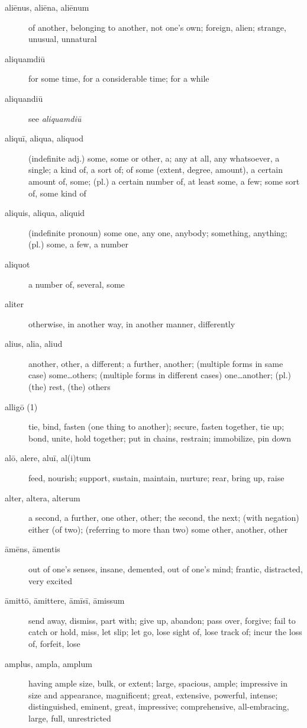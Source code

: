 \begin{description}
    \item[aliēnus, aliēna, aliēnum] of another, belonging to another, not one's own; foreign, alien; strange, unusual, unnatural
    \item[aliquamdiū] for some time, for a considerable time; for a while
    \item[aliquandiū] see \textit{aliquamdiū}
    \item[aliquī, aliqua, aliquod] (indefinite adj.) some, some or other, a; any at all, any whatsoever, a single; a kind of, a sort of; of some (extent, degree, amount), a certain amount of, some; (pl.) a certain number of, at least some, a few; some sort of, some kind of
    \item[aliquis, aliqua, aliquid] (indefinite pronoun) some one, any one, anybody; something, anything; (pl.) some, a few, a number
    \item[aliquot] a number of, several, some
    \item[aliter] otherwise, in another way, in another manner, differently
    \item[alius, alia, aliud] another, other, a different; a further, another; (multiple forms in same case) some\dots others; (multiple forms in different cases) one\dots another; (pl.) (the) rest, (the) others
    \item[alligō (1)] tie, bind, fasten (one thing to another); secure, fasten together, tie up; bond, unite, hold together; put in chains, restrain; immobilize, pin down
    \item[alō, alere, aluī, al(i)tum] feed, nourish; support, sustain, maintain, nurture; rear, bring up, raise
    \item[alter, altera, alterum] a second, a further, one other, other; the second, the next; (with negation) either (of two); (referring to more than two) some other, another, other
    \item[āmēns, āmentis] out of one's senses, insane, demented, out of one's mind; frantic, distracted, very excited
    \item[āmittō, āmittere, āmīsī, āmissum] send away, dismiss, part with; give up, abandon; pass over, forgive; fail to catch or hold, miss, let slip; let go, lose sight of, lose track of; incur the loss of, forfeit, lose
    \item[amplus, ampla, amplum] having ample size, bulk, or extent; large, spacious, ample; impressive in size and appearance, magnificent; great, extensive, powerful, intense; distinguished, eminent, great, impressive; comprehensive, all-embracing, large, full, unrestricted

\end{description}
